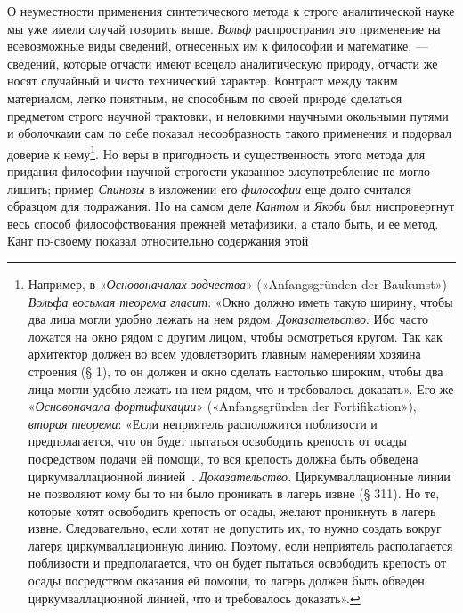 \documentclass[twoside]{article}
\begin{document}
О неуместности применения синтетического метода к строго
аналитической науке мы уже имели случай говорить выше.
{\em Вольф} распространил
это применение на всевозможные виды сведений, отнесенных им к философии и
математике, — сведений, которые отчасти имеют всецело
аналитическую природу, отчасти же носят случайный и чисто технический
характер. Контраст между таким материалом, легко понятным, не способным по
своей природе сделаться предметом строго научной трактовки, и неловкими
научными окольными путями и оболочками сам по себе показал
несообразность такого применения и подорвал доверие к
нему\footnote{Например, в
«{\em Основоначалах зодчества}»
(«Anfangsgründen der Baukunst»)
{\em Вольфа восьмая теорема гласит}: 
«Окно должно иметь такую ширину, чтобы два лица
могли удобно лежать на нем рядом.
{\em Доказательство}:
Ибо часто ложатся на окно рядом с другим лицом, чтобы
осмотреться кругом. Так как архитектор должен во всем удовлетворить главным
намерениям хозяина строения (§ 1), то он должен и окно сделать настолько
широким, чтобы два лица могли удобно лежать на нем рядом, что и требовалось
доказать». Его же
«{\em Основоначала фортификации}»
(«Anfangsgründen der Fortifikation»),
{\em вторая теорема}:
«Если неприятель расположится поблизости и предполагается,
что он будет пытаться освободить крепость от осады посредством подачи ей
помощи, то вся крепость должна быть обведена циркумваллационной
линией~\label{bkm:bm116}.
{\em Доказательство}.
Циркумваллационные линии не позволяют кому бы то ни было
проникать в лагерь извне (§ 311). Но те, которые хотят освободить крепость
от осады, желают проникнуть в лагерь извне. Следовательно, если хотят не
допустить их, то нужно создать вокруг лагеря циркумваллационную линию.
Поэтому, если неприятель располагается поблизости и предполагается, что он
будет пытаться освободить крепость от осады посредством оказания ей помощи,
то лагерь должен быть обведен циркумваллационной линией, что и требовалось
доказать».}. Но веры в пригодность и существенность этого
метода для придания философии научной строгости указанное злоупотребление
не могло лишить; пример {\em Спинозы}
в изложении его
{\em философии} еще долго
считался образцом для подражания. Но на самом деле
{\em Кантом} и
{\em Якоби} был
ниспровергнут весь способ философствования прежней метафизики, а стало
быть, и ее метод. Кант по-своему показал относительно содержания этой
\end{document}
